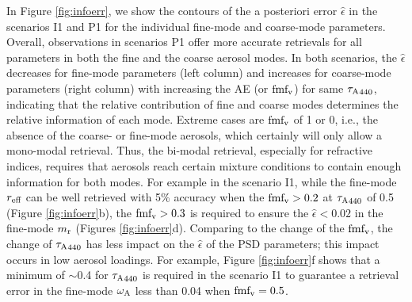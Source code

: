 In Figure \ref{fig:infoerr}, we show the contours of
the a posteriori error $\hat\epsilon$ in the scenarios I1 and P1 for the 
individual fine-mode and coarse-mode parameters. Overall, 
observations in scenarios P1 offer more accurate retrievals for all parameters
in both the fine and the coarse aerosol modes. In both scenarios, the
$\hat\epsilon$ decreases for fine-mode parameters (left column) and increases for 
coarse-mode parameters (right column) with increasing the AE (or $\text{fmf}_\text{v}$) for same
${\tau_\text{A}}_{440}$, indicating that the relative contribution
of fine and coarse modes determines the relative information of each
mode. Extreme cases are $\text{fmf}_\text{v}$ of 1 or 0, i.e., the absence of the
coarse- or fine-mode aerosols, which certainly will only allow a
mono-modal retrieval. Thus, the bi-modal retrieval, especially for
refractive indices, requires that aerosols reach certain mixture
conditions to contain enough information for both modes. For example in
the scenario I1, while the fine-mode $r_\text{eff}$ can be well retrieved with 5\%
accuracy when the $\text{fmf}_\text{v}>0.2$ at ${\tau_\text{A}}_{440}$ of 0.5 (Figure
\ref{fig:infoerr}b), the $\text{fmf}_\text{v}>0.3$ is required to ensure the
$\hat\epsilon<0.02$ in the fine-mode $m_\text{r}$ (Figures
\ref{fig:infoerr}d). Comparing to the change of the $\text{fmf}_\text{v}$, the change of
${\tau_\text{A}}_{440}$ has less impact on the $\hat\epsilon$ of the PSD parameters;
this impact occurs in low aerosol loadings. For example, Figure
\ref{fig:infoerr}f shows that a minimum of $\sim$0.4
for ${\tau_\text{A}}_{440}$ is required in the scenario I1 to guarantee a retrieval
error in the fine-mode $\omega_\text{A}$ less than 0.04 when $\text{fmf}_\text{v}=0.5$. 

